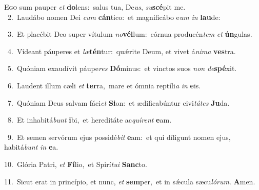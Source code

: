 \lettrine{\initial\textcolor{\initialcolor}{E}}{go} sum pauper \textit{et} \textbf{do}\-lens:~\star salus tua, De\-\textit{us}\-, \textit{su}\-\textbf{scé}pit me.\\
{\numbfont\textcolor{\numbcolor}{~2.}}~Laudábo nomen Dei \textit{cum} \textbf{cán}\-tico:~\star et magnificábo e\textit{um} \textit{in} \textbf{lau}\-de:\par
{\numbfont\textcolor{\numbcolor}{~3.}}~Et placébit Deo super vítulum \textit{no}\-\textbf{vél}lum:~\star córnua producén\textit{tem} \textit{et} \textbf{ún}\-gulas.\par
{\numbfont\textcolor{\numbcolor}{~4.}}~Vídeant páuperes et \textit{læ}\-\textbf{tén}tur:~\star quǽrite Deum, et vivet á\-\textit{ni}\-\textit{ma} \textbf{ves}\-tra.\par
{\numbfont\textcolor{\numbcolor}{~5.}}~Quóniam exaudívit páupe\textit{res} \textbf{Dó}\-minus:~\star et vinctos suos \textit{non} \textit{de}\-\textbf{spé}xit.\par
{\numbfont\textcolor{\numbcolor}{~6.}}~Laudent illum cæli \textit{et} \textbf{ter}\-ra,~\star mare et ómnia reptíli\textit{a} \textit{in} \textbf{e}\-is.\par
{\numbfont\textcolor{\numbcolor}{~7.}}~Quóniam Deus salvam fáci\textit{et} \textbf{Si}\-on:~\star et ædificabúntur civi\-\textit{tá}\-\textit{tes} \textbf{Ju}\-da.\par
{\numbfont\textcolor{\numbcolor}{~8.}}~Et inhabitá\textit{bunt} \textbf{i}\-bi,~\star et hereditáte ac\-\textit{quí}\-\textit{rent} \textbf{e}\-am.\par
{\numbfont\textcolor{\numbcolor}{~9.}}~Et semen servórum ejus possidé\textit{bit} \textbf{e}\-am:~\star et qui díligunt nomen ejus, habitá\textit{bunt} \textit{in} \textbf{e}\-a.\par
{\numbfont\textcolor{\numbcolor}{10.}}~Glória Patri, \textit{et} \textbf{Fí}\-lio,~\star et Spirí\-\textit{tu}\-\textit{i} \textbf{Sanc}\-to.\par
{\numbfont\textcolor{\numbcolor}{11.}}~Sicut erat in princípio, et nunc, \textit{et} \textbf{sem}\-per,~\star et in sǽcula sæcu\-\textit{ló}\-\textit{rum}. \textbf{A}\-men.\par
